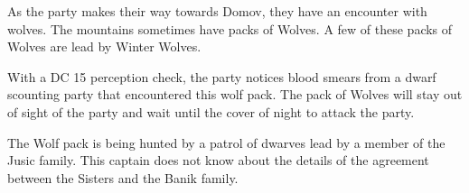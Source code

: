 As the party makes their way towards Domov, they have an encounter with wolves.
The mountains sometimes have packs of Wolves.
A few of these packs of Wolves are lead by Winter Wolves.

With a DC 15 perception check, the party notices blood smears from a dwarf scounting party that encountered this wolf pack.
The pack of Wolves will stay out of sight of the party and wait until the cover of night to attack the party.

The Wolf pack is being hunted by a patrol of dwarves lead by a member of the Jusic family.
This captain does not know about the details of the agreement between the Sisters and the Banik family.
